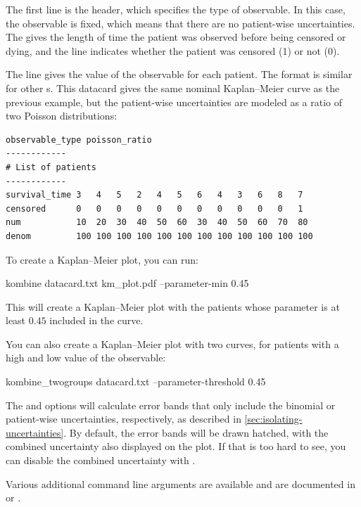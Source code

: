 \documentclass[article]{jss}
\newcommand{\KM}{Kaplan--Meier} %
\begin{document}
The first line is the header, which specifies the type of observable.  In this case, the observable is fixed, which means that there are no patient-wise uncertainties.  The  gives the length of time the patient was observed before being censored or dying, and the  line indicates whether the patient was censored (1) or not (0).

The  line gives the value of the observable for each patient.  The format is similar for other s.  This datacard gives the same nominal \KM{} curve as the previous example, but the patient-wise uncertainties are modeled as a ratio of two Poisson distributions:
\begin{verbatim}
observable_type poisson_ratio
------------
# List of patients
------------
survival_time 3   4   5   2   4   5   6   4   3   6   8   7
censored      0   0   0   0   0   0   0   0   0   0   0   1
num           10  20  30  40  50  60  30  40  50  60  70  80
denom         100 100 100 100 100 100 100 100 100 100 100 100
\end{verbatim}

To create a \KM{} plot, you can run:
\begin{CodeInput}
kombine datacard.txt km_plot.pdf --parameter-min 0.45
\end{CodeInput}
This will create a \KM{} plot with the patients whose parameter is at least \(0.45\) included in the curve.

You can also create a \KM{} plot with two curves, for patients with a high and low value of the observable:
\begin{CodeInput}
kombine_twogroups datacard.txt --parameter-threshold 0.45
\end{CodeInput}

The  and  options will calculate error bands that only include the binomial or patient-wise uncertainties, respectively, as described in \cref{sec:isolating-uncertainties}.  By default, the error bands will be drawn hatched, with the combined uncertainty also displayed on the plot.  If that is too hard to see, you can disable the combined uncertainty with .

Various additional command line arguments are available and are documented in  or .
\end{document}
